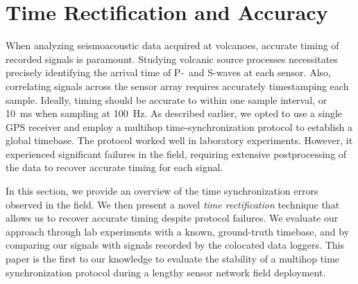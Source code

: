 \section{Time Rectification and Accuracy}
\label{sec-timing}



When analyzing seismoacoustic data acquired at volcanoes, accurate 
timing of recorded signals is paramount. Studying volcanic source processes
necessitates precisely identifying the arrival time of P-~and S-waves 
at each sensor. Also, correlating signals across the sensor
array requires accurately timestamping each sample.  Ideally, timing should
be accurate to within one sample interval, or 10~ms when sampling at 100~Hz.
As described earlier, 
we opted to
use a single GPS receiver and employ a multihop time-synchronization protocol
to establish a global timebase. The protocol worked well
in laboratory experiments. However, it experienced significant failures in
the field, requiring extensive postprocessing of the data to recover accurate
timing for each signal.

In this section, we provide an overview of the time synchronization errors
observed in the field. We then present a novel {\em time rectification}
technique that allows us to recover accurate timing despite protocol
failures.  
We evaluate our approach through
lab experiments with a known, ground-truth timebase, and by comparing our
signals with signals recorded by the colocated data loggers. This
paper is the first to our knowledge to evaluate the stability of a multihop
time synchronization protocol during a lengthy sensor network 
field deployment. 

